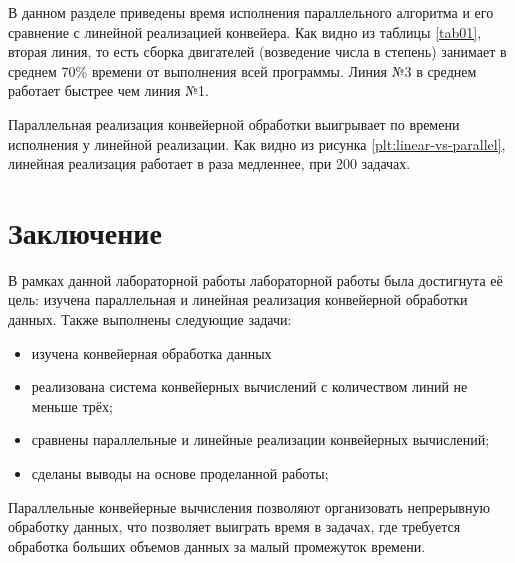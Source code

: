 \documentclass[12pt]{report}
\begin{document}
В данном разделе приведены время исполнения параллельного алгоритма и его сравнение с линейной реализацией конвейера. Как видно из таблицы \ref{tab01}, вторая линия, то есть сборка двигателей (возведение числа в степень) занимает в среднем 70\% времени от выполнения всей программы. Линия №3 в среднем работает быстрее чем линия №1.

Параллельная реализация конвейерной обработки выигрывает по времени исполнения у линейной реализации. Как видно из рисунка \ref{plt:linear-vs-parallel}, линейная реализация работает в раза медленнее, при 200 задачах.

\chapter*{Заключение}

В рамках данной лабораторной работы лабораторной работы была достигнута её цель: изучена параллельная и линейная реализация конвейерной обработки данных. Также выполнены следующие задачи:

\begin{itemize}
	\item изучена конвейерная обработка данных
	\item реализована система конвейерных вычислений с количеством линий не меньше трёх;
	\item сравнены параллельные и линейные реализации конвейерных вычислений;
	\item сделаны выводы на основе проделанной работы;
\end{itemize}

Параллельные конвейерные вычисления позволяют организовать непрерывную обработку данных, что позволяет выиграть время в задачах, где требуется обработка больших объемов данных за малый промежуток времени.



\end{document}
